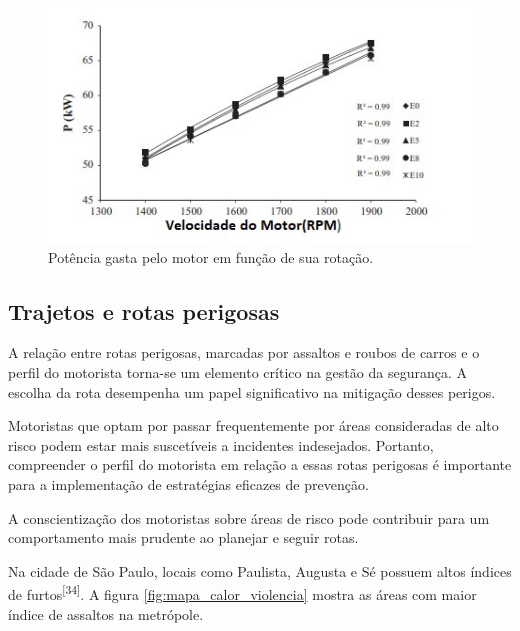  \begin{figure}[hp]
    \centering
    
    \includegraphics[scale= 1]{figures/rpmxpotencia.jpeg}
    
    \caption{Potência gasta pelo motor em função de sua rotação.}
    
    \label{fig:rpmxpotencia}
\end{figure}

\subsection{Trajetos e rotas perigosas}

A relação entre rotas perigosas, marcadas por assaltos e roubos de carros e o perfil do motorista torna-se um elemento crítico na gestão da segurança. A escolha da rota desempenha um papel significativo na mitigação desses perigos. 

Motoristas que optam por passar frequentemente por áreas consideradas de alto risco podem estar mais suscetíveis a incidentes indesejados. Portanto, compreender o perfil do motorista em relação a essas rotas perigosas é importante para a implementação de estratégias eficazes de prevenção. 

A conscientização dos motoristas sobre áreas de risco pode contribuir para um comportamento mais prudente ao planejar e seguir rotas.

Na cidade de São Paulo, locais como Paulista, Augusta e Sé possuem altos índices de furtos\textsuperscript{[34]}. A figura \ref{fig:mapa_calor_violencia} mostra as áreas com maior índice de assaltos na metrópole.

